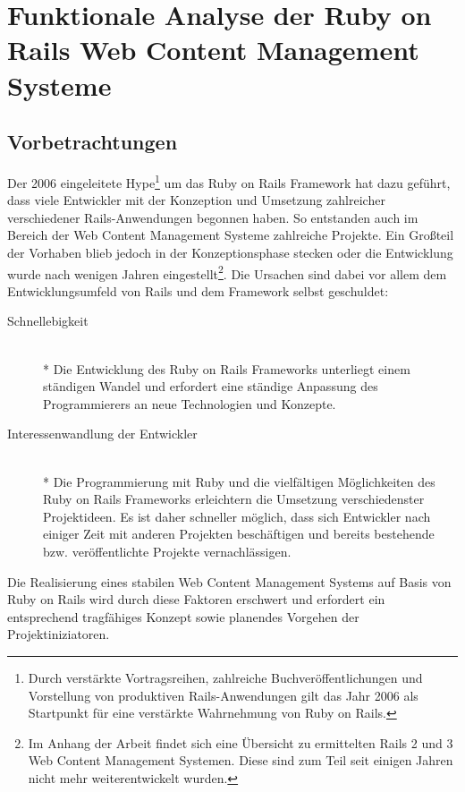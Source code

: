 \chapter{Funktionale Analyse der Ruby on Rails Web Content Management Systeme}


\section{Vorbetrachtungen}
Der 2006 eingeleitete Hype\footnote{Durch verstärkte Vortragsreihen, zahlreiche Buchveröffentlichungen und Vorstellung von produktiven Rails-Anwendungen gilt das Jahr 2006 als Startpunkt für eine verstärkte Wahrnehmung von Ruby on Rails.} um das Ruby on Rails Framework hat dazu geführt, dass viele Entwickler mit der Konzeption und Umsetzung zahlreicher verschiedener Rails-Anwendungen begonnen haben. So entstanden auch im Bereich der Web Content Management Systeme zahlreiche Projekte. Ein Großteil der Vorhaben blieb jedoch in der Konzeptionsphase stecken oder die Entwicklung wurde nach wenigen Jahren eingestellt\footnote{Im Anhang der Arbeit findet sich eine Übersicht zu ermittelten Rails 2 und 3 Web Content Management Systemen. Diese sind zum Teil seit einigen Jahren nicht mehr weiterentwickelt wurden.}. Die Ursachen sind dabei vor allem dem Entwicklungsumfeld von Rails und dem Framework selbst geschuldet:


\begin{description}
\item[Schnellebigkeit]\mbox{~}\\*
Die Entwicklung des Ruby on Rails Frameworks unterliegt einem ständigen Wandel und erfordert eine ständige Anpassung des Programmierers an neue Technologien und Konzepte.
\item[Interessenwandlung der Entwickler]\mbox{~}\\*
Die Programmierung mit Ruby und die vielfältigen Möglichkeiten des Ruby on Rails Frameworks erleichtern die Umsetzung verschiedenster Projektideen.
Es ist daher schneller möglich, dass sich Entwickler nach einiger Zeit mit anderen Projekten beschäftigen und bereits bestehende bzw. veröffentlichte Projekte vernachlässigen.
\end{description}

Die Realisierung eines stabilen Web Content Management Systems auf Basis von Ruby on Rails wird durch diese Faktoren erschwert und erfordert ein entsprechend tragfähiges Konzept sowie planendes Vorgehen der Projektiniziatoren.

